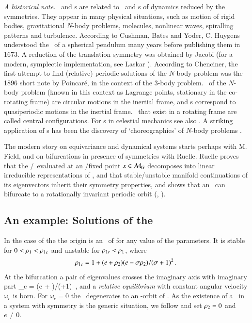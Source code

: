 \documentclass[final,number,sort&compress]{elsarticle}
\begin{document}
\emph{A historical note.}
\Reqva\ and \rpo s are
related to \eqva\ and \po s of dynamics
reduced by the symmetries. They appear in many physical
situations, such as motion of rigid bodies, gravitational
$N$-body problems, molecules, nonlinear waves, spiralling
patterns and turbulence. According to Cushman,
Bates and Yoder, C.
Huygens understood the \reqva\ of a spherical
pendulum many years before publishing them in 1673. A
reduction of the translation symmetry was obtained by Jacobi
(for a modern, symplectic implementation, see Laskar
\etal{}). According to Chenciner, the
first attempt to find (relative) periodic solutions of the
$N$-body problem was the 1896 short note by
Poincar\'e, in the context of the 3-body
problem. \Reqva\ of the $N$-body problem (known in this
context as Lagrange points, stationary in the co-rotating
frame) are circular motions in the inertial frame, and {\rpo
s} correspond to quasiperiodic motions in the inertial frame.
\Reqva\ that exist in a rotating frame are called central
configurations. For \rpo s in celestial mechanics see also
. A striking application of \rpo s has been
the discovery of `choreographies' of $N$-body problems%
.

The modern story on equivariance and dynamical systems starts
perhaps with M. Field, and on bifurcations in
presence of symmetries  with Ruelle. Ruelle
proves that the \stabmat/\jacobianM\ evaluated at an
\eqv/fixed point $x \in {\cal M}_G$ decomposes into linear
irreducible representations of \Group, and that
stable/unstable manifold continuations of its eigenvectors
inherit their symmetry properties, and shows that an \eqv\
can bifurcate to a rotationally in\-vari\-ant periodic orbit
(\ie, \reqv).


\subsection{\label{s:CLEsols} An example: Solutions of the \cLe}

In the case of the {\cLe}  the origin  is an \eqv\ of
 for any value of the parameters. It is stable
for $0<\rho_1<\rho_{1c}$ and unstable for
$\rho_{1c}<\rho_1$, where
\[
	\rho_{1c} = 1 + {(e+\rho_2)(e-\sigma \rho_2)}/{(\sigma+1)^2}
\,.
\]
At the bifurcation a pair of eigenvalues crosses
the imaginary axis with imaginary part
\beq
	\omega_c = {\sigma (e + \ImrCLor)}/{(\sigma+1)}
\,,
and a \emph{relative equilibrium}  with constant
angular velocity $\omega_c$ is born. For $\omega_c =0$ the
\reqv\ degenerates to an -orbit of \eqva. As the
existence of a \reqv\ in a system with \SOn{2} symmetry is
the generic situation, we follow 
and set $\rho_2=0$ and $e \neq 0$.
\end{document}
